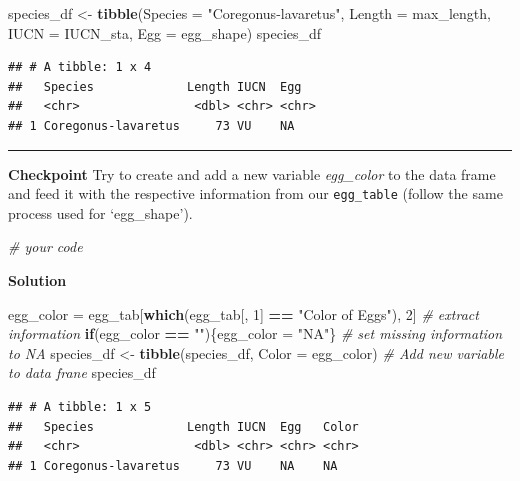 \documentclass[
]{book}
\newenvironment{Shaded}{\begin{snugshade}}{\end{snugshade}}
\newcommand{\CommentTok}[1]{\textcolor[rgb]{0.56,0.35,0.01}{\textit{#1}}}
\newcommand{\ControlFlowTok}[1]{\textcolor[rgb]{0.13,0.29,0.53}{\textbf{#1}}}
\newcommand{\DataTypeTok}[1]{\textcolor[rgb]{0.13,0.29,0.53}{#1}}
\newcommand{\DecValTok}[1]{\textcolor[rgb]{0.00,0.00,0.81}{#1}}
\newcommand{\KeywordTok}[1]{\textcolor[rgb]{0.13,0.29,0.53}{\textbf{#1}}}
\newcommand{\NormalTok}[1]{#1}
\newcommand{\OperatorTok}[1]{\textcolor[rgb]{0.81,0.36,0.00}{\textbf{#1}}}
\newcommand{\StringTok}[1]{\textcolor[rgb]{0.31,0.60,0.02}{#1}}
\begin{document}
\begin{Shaded}
\begin{Highlighting}[]
\NormalTok{species_df <-}\StringTok{ }\KeywordTok{tibble}\NormalTok{(}\DataTypeTok{Species =} \StringTok{"Coregonus-lavaretus"}\NormalTok{, }\DataTypeTok{Length =}\NormalTok{ max_length, }\DataTypeTok{IUCN =}\NormalTok{ IUCN_sta, }\DataTypeTok{Egg =}\NormalTok{ egg_shape)}
\NormalTok{species_df}
\end{Highlighting}
\end{Shaded}

\begin{verbatim}
## # A tibble: 1 x 4
##   Species             Length IUCN  Egg  
##   <chr>                <dbl> <chr> <chr>
## 1 Coregonus-lavaretus     73 VU    NA
\end{verbatim}

\begin{center}\rule{0.5\linewidth}{0.5pt}\end{center}

\textbf{Checkpoint}
Try to create and add a new variable \emph{egg\_color} to the data frame and feed it with the respective information from our \texttt{egg\_table} (follow the same process used for `egg\_shape').

\begin{Shaded}
\begin{Highlighting}[]
\CommentTok{# your code }
\end{Highlighting}
\end{Shaded}

\textbf{Solution}

\begin{Shaded}
\begin{Highlighting}[]
\NormalTok{egg_color =}\StringTok{ }\NormalTok{egg_tab[}\KeywordTok{which}\NormalTok{(egg_tab[, }\DecValTok{1}\NormalTok{] }\OperatorTok{==}\StringTok{ "Color of Eggs"}\NormalTok{), }\DecValTok{2}\NormalTok{]  }\CommentTok{# extract information}
\ControlFlowTok{if}\NormalTok{(egg_color }\OperatorTok{==}\StringTok{ ""}\NormalTok{)\{egg_color =}\StringTok{ "NA"}\NormalTok{\}                           }\CommentTok{# set missing information to NA}
\NormalTok{species_df <-}\StringTok{ }\KeywordTok{tibble}\NormalTok{(species_df, }\DataTypeTok{Color =}\NormalTok{ egg_color)             }\CommentTok{# Add new variable to data frane}
\NormalTok{species_df}
\end{Highlighting}
\end{Shaded}

\begin{verbatim}
## # A tibble: 1 x 5
##   Species             Length IUCN  Egg   Color
##   <chr>                <dbl> <chr> <chr> <chr>
## 1 Coregonus-lavaretus     73 VU    NA    NA
\end{verbatim}
\end{document}
